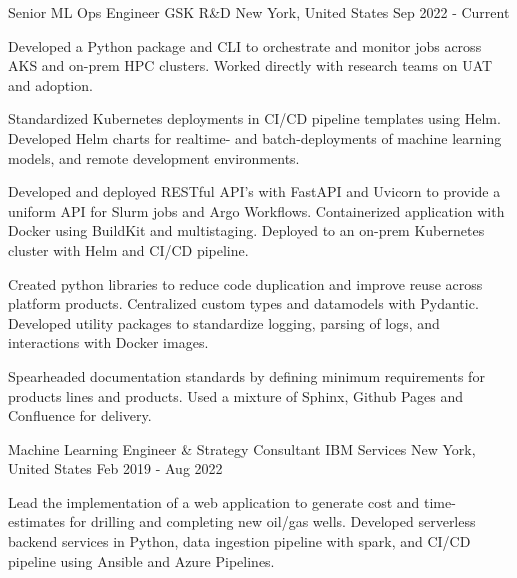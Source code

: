 

\begin{cventries}

\cventry
  {Senior ML Ops Engineer} %
  {GSK R\&D}
  {New York, United States} %
  {Sep 2022 - Current} %
  {
    \begin{cvitems} %
      \item { Developed a Python package and CLI to orchestrate and monitor jobs across AKS and on-prem HPC clusters. Worked directly with research teams on UAT and adoption. }
      \item { Standardized Kubernetes deployments in CI/CD pipeline templates using Helm. Developed Helm charts for realtime- and batch-deployments of machine learning models, and remote development environments. }
      \item { Developed and deployed RESTful API's with FastAPI and Uvicorn to provide a uniform API for Slurm jobs and Argo Workflows. Containerized application with Docker using BuildKit and multistaging. Deployed to an on-prem Kubernetes cluster with Helm and CI/CD pipeline. }
      \item { Created python libraries to reduce code duplication and improve reuse across platform products. Centralized custom types and datamodels with Pydantic. Developed utility packages to standardize logging, parsing of logs, and interactions with Docker images. }
      \item { Spearheaded documentation standards by defining minimum requirements for products lines and products. Used a mixture of Sphinx, Github Pages and Confluence for delivery. }
    \end{cvitems}
  }
  \cventry
    {Machine Learning Engineer \& Strategy Consultant} %
    {IBM Services}
    {New York, United States} %
    {Feb 2019 - Aug 2022} %
    {
      \begin{cvitems} %
        \item {Lead the implementation of a web application to generate cost and time-estimates for drilling and completing new oil/gas wells. Developed serverless backend services in Python, data ingestion pipeline with spark, and CI/CD pipeline using Ansible and Azure Pipelines.}

\end{cvitems}}
\end{cventries}
